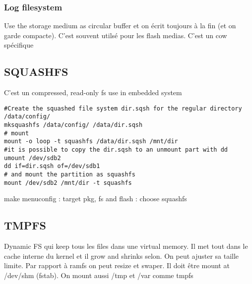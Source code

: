 \subsubsection{Log filesystem}
Use the storage medium as circular buffer et on écrit toujours à la fin (et on garde compacte). C'est souvent utilsé pour les flash medias. C'est un cow spécifique
\subsection{SQUASHFS}
C'est un compressed, read-only fs use in embedded system
\begin{Verbatim}[breaklines=true, breakanywhere=true]
#Create the squashed file system dir.sqsh for the regular directory /data/config/
mksquashfs /data/config/ /data/dir.sqsh
# mount
mount -o loop -t squashfs /data/dir.sqsh /mnt/dir
#it is possible to copy the dir.sqsh to an unmount part with dd
umount /dev/sdb2
dd if=dir.sqsh of=/dev/sdb1
# and mount the partition as squashfs
mount /dev/sdb2 /mnt/dir -t squashfs
\end{Verbatim}
make menuconfig : target pkg, fs and flash : choose squashfs
\subsection{TMPFS}
Dynamic FS qui keep tous les files dans une virtual memory. Il met tout dans le cache interne du kernel et il grow and shrinks selon. On peut ajuster sa taille limite. Par rapport à ramfs on peut resize et swaper. Il doit être mount at /dev/shm (fstab). On mount aussi /tmp et /var comme tmpfs
